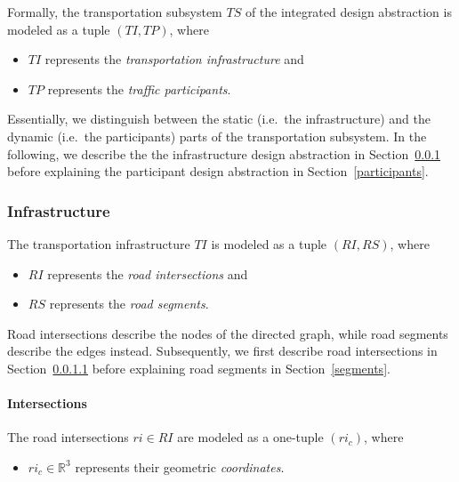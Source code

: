 Formally, the transportation subsystem $TS$ of the integrated design abstraction is modeled as a tuple $(TI, TP)$, where
\begin{itemize}
	\item $TI$ represents the \textit{transportation infrastructure} and
	\item $TP$ represents the \textit{traffic participants}.
\end{itemize}
Essentially, we distinguish between the static (i.e.\ the infrastructure) and the dynamic (i.e.\ the participants) parts of the transportation subsystem. In the following, we describe the the infrastructure design abstraction in Section~\ref{transport_infrastructure} before explaining the participant design abstraction in Section~\ref{participants}.

\subsubsection{Infrastructure}
\label{transport_infrastructure}

The transportation infrastructure $TI$ is modeled as a tuple $(RI, RS)$, where
\begin{itemize}
	\item $RI$ represents the \textit{road intersections} and
	\item $RS$ represents the \textit{road segments}.
\end{itemize}
Road intersections describe the nodes of the directed graph, while road segments describe the edges instead. Subsequently, we first describe road intersections in Section~\ref{intersections} before explaining road segments in Section~\ref{segments}.

\paragraph{Intersections}
\label{intersections}


The road intersections $ri \in RI$ are modeled as a one-tuple $(ri_c)$, where
\begin{itemize}
	\item $ri_c\in \mathbb{R}^3$ represents their geometric \textit{coordinates}.
\end{itemize}

